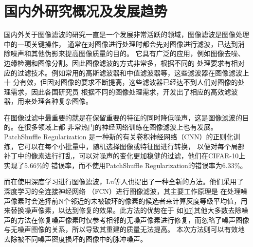 %
%
%
%

\section{国内外研究概况及发展趋势}
国内外关于图像滤波的研究一直是一个发展非常活跃的领域，图像滤波是图像处理中的一项关键操作，
通常在对图像进行处理时都会先对图像进行滤波，已达到消除噪声和其他伪影来提高图像质量的目的。
它具有广泛的应用，例如图像去噪、边缘检测和图像分割。因此图像滤波的方式非常多，根据不同的
处理要求有相对应的过滤技术。例如常用的高斯滤波器和中值滤波器等，这些滤波器在图像滤波上十
分有效，但因对图像的要求不断提高，这些滤波器已经达不到人们对图像的处理需求，因此各国研究员
根据不同的图像处理需求，开发出了相应的高效滤波器，用来处理各种复杂图像。

在图像过滤中最重要的就是在保留重要的特征的同时降低噪声，这是图像滤波的目的。在很多领域上都
非常热门的神经网络训练在图像滤波上也有发展。PatchShuffle Regularization\cite{kangPatchShuffleRegularization2017}
是一种新的有关卷积神经网络（CNN）的正则化训练，它可以在每个小批量中，随机选择图像或特征图进行转换，
以便对每个局部补丁中的像素进行打乱，可以对噪声的变化更加稳健的过滤，他们在CIFAR-10上实现了5.66\%的
错误率，而不使用PatchShuffle Regularization的错误率为6.33\%。

而在使用深度学习进行图像滤波，Lu\cite{luImageEnhancementUsing2021}等人也提出了一种全新的方法。他们采用了深度学习的全连接神经网络
（FCN）进行图像滤波，其主要工作原理是
在处理噪声像素时会选择前N个邻近的未被破环的像素的候选者来计算灰度等级平均值，用来替换噪声像素，以达到修复的效果。此方法的优势在于
如\ref{07}其他大多数去除噪声的方法在修复噪声像素时仅参考相邻的无噪声像素进行修复，而忽略了噪声图像与无噪声图像的关系，所以导致其重建的质量无法提高。
本次方法则可以有效地去除被不同噪声密度损坏的图像中的脉冲噪声。

